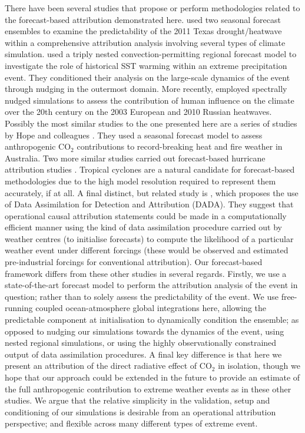   There have been several studies that propose or perform methodologies related to the forecast-based attribution demonstrated here. \citet{hoerling_anatomy_2013} used two seasonal forecast ensembles to examine the predictability of the 2011 Texas drought/heatwave within a comprehensive attribution analysis involving several types of climate simulation. \citet{meredith_crucial_2015} used a triply nested convection-permitting regional forecast model to investigate the role of historical SST warming within an extreme precipitation event. They conditioned their analysis on the large-scale dynamics of the event through nudging in the outermost domain. More recently, \citet{van_garderen_methodology_2021} employed spectrally nudged simulations to assess the contribution of human influence on the climate over the 20th century on the 2003 European and 2010 Russian heatwaves. Possibly the most similar studies to the one presented here are a series of studies by Hope and colleagues \citep{hope_contributors_2015,hope_what_2016,hope_determining_2019}. They used a seasonal forecast model to assess anthropogenic CO$_2$ contributions to record-breaking heat and fire weather in Australia. Two more similar studies carried out forecast-based hurricane attribution studies \citep{reed_forecasted_2020,lackmann_hurricane_2015}. Tropical cyclones are a natural candidate for forecast-based methodologies due to the high model resolution required to represent them accurately, if at all. A final distinct, but related study is \citet{hannart_dada_2016}, which proposes the use of Data Assimilation for Detection and Attribution (DADA). They suggest that operational causal attribution statements could be made in a computationally efficient manner using the kind of data assimilation procedure carried out by weather centres (to initialise forecasts) to compute the likelihood of a particular weather event under different forcings (these would be observed and estimated pre-industrial forcings for conventional attribution). Our forecast-based framework differs from these other studies in several regards. Firstly, we use a state-of-the-art forecast model to perform the attribution analysis of the event in question; rather than to solely assess the predictability of the event. We use free-running coupled ocean-atmosphere global integrations here, allowing the predictable component at initialisation to dynamically condition the ensemble; as opposed to nudging our simulations towards the dynamics of the event, using nested regional simulations, or using the highly observationally constrained output of data assimilation procedures. A final key difference is that here we present an attribution of the direct radiative effect of CO$_2$ in isolation, though we hope that our approach could be extended in the future to provide an estimate of the full anthropogenic contribution to extreme weather events as in these other studies. We argue that the relative simplicity in the validation, setup and conditioning of our simulations is desirable from an operational attribution perspective; and flexible across many different types of extreme event. 

